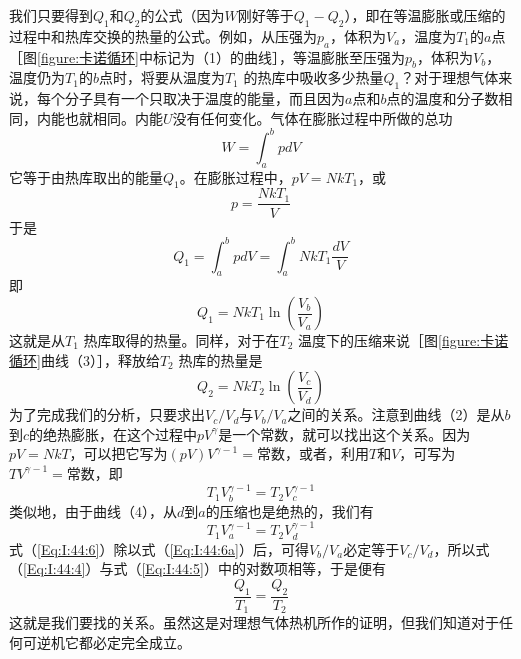 我们只要得到$Q_1$和$Q_2$的公式（因为$W$刚好等于$Q_1-Q_2$），即在等温膨胀或压缩的过程中和热库交换的热量的公式。例如，从压强为$p_a$，体积为$V_a$，温度为$T_1$的$a$点［图\ref{figure:卡诺循环}中标记为（1）的曲线］，等温膨胀至压强为$p_b$，体积为$V_b$，温度仍为$T_1$的$b$点时，将要从温度为$T_1$ 的热库中吸收多少热量$Q_1$？对于理想气体来说，每个分子具有一个只取决于温度的能量，而且因为$a$点和$b$点的温度和分子数相同，内能也就相同。内能$U$没有任何变化。气体在膨胀过程中所做的总功
\begin{equation*}
    W=\int_a^b pdV
\end{equation*}
它等于由热库取出的能量$Q_1$。在膨胀过程中，$pV =NkT_1$，或
\begin{equation*}
    p=\frac{NkT_1}{V}
\end{equation*}
于是
\begin{equation}
    \label{Eq:I:44:4}
    Q_1 = \int_a^b pdV = \int_a^b NkT_1\frac{dV}{V}
\end{equation}
即
\begin{equation*}
    Q_1 = NkT_1\ln\left(\frac{V_b}{V_a}\right)
\end{equation*}
这就是从$T_1$ 热库取得的热量。同样，对于在$T_2$ 温度下的压缩来说［图\ref{figure:卡诺循环}曲线（3）］，释放给$T_2$ 热库的热量是
\begin{equation}
    \label{Eq:I:44:5}
    Q_2 = NkT_2\ln\left(\frac{V_c}{V_d}\right)
\end{equation}
为了完成我们的分析，只要求出$V_c /V_d$与$V_b /V_a$之间的关系。注意到曲线（2）是从$b $到$c $的绝热膨胀，在这个过程中$pV^{\gamma}$是一个常数，就可以找出这个关系。因为$pV=NkT$，可以把它写为$(pV)V^{\gamma -1} =\text{常数}$，或者，利用$T$和$V$，可写为$TV^{\gamma -1} =\text{常数}$，即
\begin{equation}
    \label{Eq:I:44:6}
    T_1V_b^{\gamma -1}=T_2V_c^{\gamma -1}
\end{equation}
类似地，由于曲线（4），从$d$到$a$的压缩也是绝热的，我们有
\begin{equation}
    \label{Eq:I:44:6a}
    \tag{44.6a}
    T_1V_a^{\gamma -1}=T_2V_d^{\gamma -1}
\end{equation}
式（\ref{Eq:I:44:6}）除以式（\ref{Eq:I:44:6a}）后，可得$V_b /V_a$必定等于$V_c /V_d$，所以式（\ref{Eq:I:44:4}）与式（\ref{Eq:I:44:5}）中的对数项相等，于是便有
\begin{equation}
    \label{Eq:I:44:7}
    \frac{Q_1}{T_1} = \frac{Q_2}{T_2}
\end{equation}
这就是我们要找的关系。虽然这是对理想气体热机所作的证明，但我们知道对于任何可逆机它都必定完全成立。

